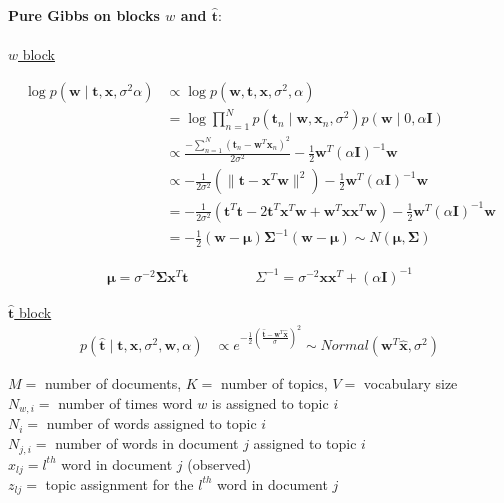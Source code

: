 \documentclass[10pt]{homeworg}
\begin{document}
\textbf{Pure Gibbs on blocks $w$ and $\hat{\boldsymbol t}$}:\\
\\
\underline{$w$ block}

\begin{align*}
\log{p(\boldsymbol w \mid \boldsymbol t,\boldsymbol x,\sigma^2\alpha)} &\propto \log{p(\boldsymbol w,\boldsymbol t,\boldsymbol x,\sigma^2,\alpha)}\\
&= \log{\prod_{n=1}^N p(\boldsymbol t_n \mid \boldsymbol w,\boldsymbol x_n,\sigma^2)p(\boldsymbol w \mid 0, \alpha \boldsymbol I)}\\
&\propto \frac{-\sum_{n=1}^N (\boldsymbol t_n-\boldsymbol w^T\boldsymbol x_n)^2}{2\sigma^2} - \frac{1}{2}\boldsymbol w^T(\alpha \boldsymbol I)^{-1}\boldsymbol w\\
&\propto -\frac{1}{2\sigma^2}(\|\boldsymbol t-\boldsymbol x^T\boldsymbol w \|^2)-\frac{1}{2}\boldsymbol w^T(\alpha \boldsymbol I)^{-1}\boldsymbol w\\
&= -\frac{1}{2\sigma^2}(\boldsymbol t^T\boldsymbol t-2\boldsymbol t^T\boldsymbol x^T\boldsymbol w+\boldsymbol w^T\boldsymbol x\boldsymbol x^T\boldsymbol w)-\frac{1}{2}\boldsymbol w^T(\alpha \boldsymbol I)^{-1}\boldsymbol w\\
&= -\frac{1}{2}(\boldsymbol w-\boldsymbol \mu)\boldsymbol \Sigma^{-1}(\boldsymbol w-\boldsymbol \mu) \sim N(\boldsymbol \mu,\boldsymbol \Sigma)
\end{align*}

\vspace{-1cm}

\begin{align*}
\boldsymbol \mu = \sigma^{-2}\boldsymbol \Sigma \boldsymbol x^T \boldsymbol t  \hspace{2cm} \Sigma^{-1} = \sigma^{-2}\boldsymbol x\boldsymbol x^T + (\alpha \boldsymbol I)^{-1}
\end{align*}


\underline{$\hat{\boldsymbol t}$ block}
\begin{align*}
p(\hat{\boldsymbol t} \mid \boldsymbol t, \boldsymbol x, \sigma^2, \boldsymbol w, \alpha) &\propto e^{-\frac{1}{2}(\frac{\hat{\boldsymbol t}-\boldsymbol w^T\hat{\boldsymbol x}}{\sigma})^2} \sim Normal(\boldsymbol w^T\hat{\boldsymbol x}, \sigma^2)
\end{align*}

\exercise
$M = $ number of documents, $K = $ number of topics, $V = $ vocabulary size\\
$N_{w,i} = $ number of times word $w$ is assigned to topic $i$\\
$N_i = $ number of words assigned to topic $i$\\
$N_{j,i} = $ number of words in document $j$ assigned to topic $i$\\
$x_{lj} = l^{th}$ word in document $j$ (observed)\\
$z_{lj} = $ topic assignment for the $l^{th}$ word in document $j$
\end{document}
